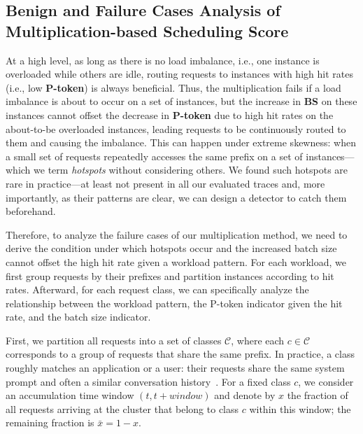 \subsection{Benign and Failure Cases Analysis of Multiplication-based Scheduling Score}
\label{sec:m-analyze}

At a high level, as long as there is no load imbalance,
i.e., one instance is overloaded while others are idle,
routing requests to instances with high {\kvcache} hit rates (i.e., low \textbf{P-token})
is always beneficial.
Thus, the multiplication fails if a load imbalance is about to occur on a set of instances,
but the increase in \textbf{BS} on these instances cannot offset the decrease in \textbf{P-token} due to high {\kvcache} hit rates
on the about-to-be overloaded instances,
leading requests to be continuously routed to them and causing the imbalance. 
This can happen under extreme {\kvcache} skewness:
when a small set of requests repeatedly accesses the same
prefix on a set of instances---which we term \emph{{\kvcache} hotspots} without considering others.
We found such hotspots are rare in practice---at least not
present in all our evaluated traces and, more
importantly, as their patterns are clear, we can design a detector to catch them beforehand.

Therefore, to analyze the failure cases of our multiplication method,
we need to derive the condition under which {\kvcache} hotspots occur and
the increased batch size cannot offset the high {\kvcache} hit rate given a workload pattern.
For each workload, we first group requests by their {\kvcache} prefixes
and partition instances according to {\kvcache} hit rates.
Afterward, for each request class, we can specifically analyze the
relationship between the workload pattern, the P-token indicator given the {\kvcache} hit rate,
and the batch size indicator.

First, we partition all requests into a set of classes
\(\mathcal{C}\), where each \(c\!\in\!\mathcal{C}\) corresponds to a
group of requests that share the same {\kvcache} prefix.
In practice, a class roughly matches an application or a user: their
requests share the same system prompt and often a similar conversation
history~\cite{10.5555/3768039.3768067}.
For a fixed class \(c\), we consider an accumulation time window
\((t, t+\textit{window})\) and denote by \(x\) the fraction of all
requests arriving at the cluster that belong to class \(c\) within this window; the
remaining fraction is \(\bar{x} = 1-x\).

